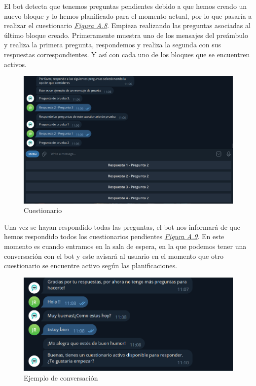 El bot detecta que tenemos preguntas pendientes debido a que hemos creado un nuevo bloque y lo hemos planificado para el momento actual, por lo que pasaría a realizar el cuestionario \textit{\hyperref[fig:cuestionario2]{Figura A.8}}. Empieza realizando las preguntas asociadas al último bloque creado. Primeramente muestra uno de los mensajes del preámbulo y realiza la primera pregunta, respondemos y realiza la segunda con sus respuestas correspondientes. Y así con cada uno de los bloques que se encuentren activos. 

\begin{figure}[!ht]
    \centering
    \includegraphics[width=1\textwidth]{imagenes/bot2.png}
    \caption{ Cuestionario }
    \label{fig:cuestionario2}
\end{figure}

Una vez se hayan respondido todas las preguntas, el bot nos informará de que hemos respondido todos los cuestionarios pendientes \textit{\hyperref[fig:cuestionario3]{Figura A.9}}. En este momento es cuando entramos en la sala de espera, en la que podemos tener una conversación con el bot y este avisará al usuario en el momento que otro cuestionario se encuentre activo según las planificaciones.


\begin{figure}[!ht]
    \centering
    \includegraphics[width=1\textwidth]{imagenes/bot3.png}
    \caption{ Ejemplo de conversación }
    \label{fig:cuestionario3}
\end{figure}\vspace{0.5cm}

